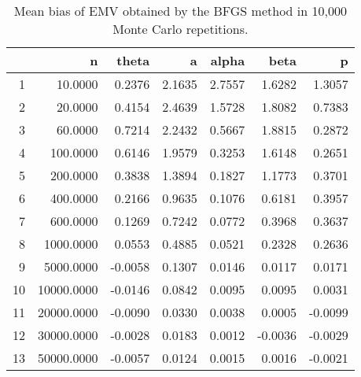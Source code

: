 \documentclass[12pt]{article}
\begin{document}
\thispagestyle{empty}
\begin{table}[ht]
\centering
\begin{tabular}{rrrrrrr}
  \hline
 & n & theta & a & alpha & beta & p \\ 
  \hline
1 & 10.0000 & 0.2376 & 2.1635 & 2.7557 & 1.6282 & 1.3057 \\ 
  2 & 20.0000 & 0.4154 & 2.4639 & 1.5728 & 1.8082 & 0.7383 \\ 
  3 & 60.0000 & 0.7214 & 2.2432 & 0.5667 & 1.8815 & 0.2872 \\ 
  4 & 100.0000 & 0.6146 & 1.9579 & 0.3253 & 1.6148 & 0.2651 \\ 
  5 & 200.0000 & 0.3838 & 1.3894 & 0.1827 & 1.1773 & 0.3701 \\ 
  6 & 400.0000 & 0.2166 & 0.9635 & 0.1076 & 0.6181 & 0.3957 \\ 
  7 & 600.0000 & 0.1269 & 0.7242 & 0.0772 & 0.3968 & 0.3637 \\ 
  8 & 1000.0000 & 0.0553 & 0.4885 & 0.0521 & 0.2328 & 0.2636 \\ 
  9 & 5000.0000 & -0.0058 & 0.1307 & 0.0146 & 0.0117 & 0.0171 \\ 
  10 & 10000.0000 & -0.0146 & 0.0842 & 0.0095 & 0.0095 & 0.0031 \\ 
  11 & 20000.0000 & -0.0090 & 0.0330 & 0.0038 & 0.0005 & -0.0099 \\ 
  12 & 30000.0000 & -0.0028 & 0.0183 & 0.0012 & -0.0036 & -0.0029 \\ 
  13 & 50000.0000 & -0.0057 & 0.0124 & 0.0015 & 0.0016 & -0.0021 \\ 
   \hline
\end{tabular}
\caption{Mean bias of EMV obtained by the BFGS method in 10,000 Monte Carlo repetitions.} 
\end{table}
\end{document}
